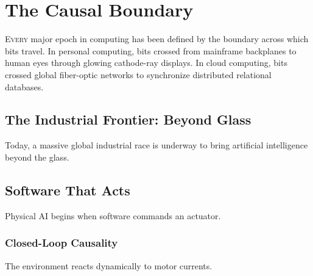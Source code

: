 \documentclass[
  10pt,
  letterpaper,
  twoside,
  openright,
  numbers=noenddot,
  headings=standardclasses
]{scrbook}
\begin{document}
\mainmatter

\chapter{The Causal Boundary}

\begin{marginfigure}
\chapterminitoc
\end{marginfigure}

\lettrine{E}{very} major epoch in computing has been defined by the boundary across which bits travel. In personal computing, bits crossed from mainframe backplanes to human eyes through glowing cathode-ray displays. In cloud computing, bits crossed global fiber-optic networks to synchronize distributed relational databases.

\section{The Industrial Frontier: Beyond Glass}
Today, a massive global industrial race is underway to bring artificial intelligence beyond the glass.

\section{Software That Acts}
Physical AI begins when software commands an actuator.

\subsection{Closed-Loop Causality}
The environment reacts dynamically to motor currents.
\end{document}
